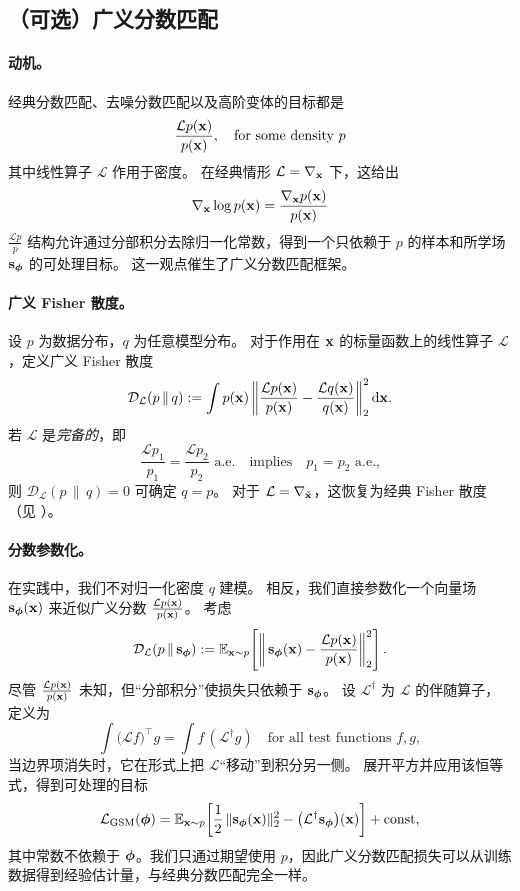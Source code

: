 \subsection{（可选）广义分数匹配}


\paragraph{动机。}
经典分数匹配、去噪分数匹配以及高阶变体的目标都是
\[
\frac{\mathcal L p({\mathbf{x}})}{p({\mathbf{x}})},\quad\text{for some density } p
\]
其中线性算子 $\mathcal L$ 作用于密度。
在经典情形 $\mathcal L=\nabla_{{\mathbf{x}}}$ 下，这给出
\[
\nabla_{{\mathbf{x}}}\log p({\mathbf{x}}) = \frac{\nabla_{{\mathbf{x}}} p({\mathbf{x}})}{p({\mathbf{x}})}
\]
$\frac{\mathcal L p}{p}$ 结构允许通过分部积分去除归一化常数，得到一个只依赖于 $p$ 的样本和所学场 ${\mathbf{s}}_{\bm{\phi}}$ 的可处理目标。
这一观点催生了广义分数匹配框架。

\paragraph{广义 Fisher 散度。}
设 $p$ 为数据分布，$q$ 为任意模型分布。
对于作用在 ${\mathbf{x}}$ 的标量函数上的线性算子 $\mathcal L$，定义广义 Fisher 散度
\[
\mathcal D_{\mathcal L}(p \,\|\, q)
:= \int p({\mathbf{x}}) 
\left\|
\frac{\mathcal L p({\mathbf{x}})}{p({\mathbf{x}})}
-
\frac{\mathcal L q({\mathbf{x}})}{q({\mathbf{x}})}
\right\|_2^2 \mathop{}\!\mathrm{d} {\mathbf{x}}.
\]
若 $\mathcal L$ 是\emph{完备的}，即
\[
\frac{\mathcal L p_1}{p_1}=\frac{\mathcal L p_2}{p_2} \text{ a.e.}\quad \text{implies}\quad p_1=p_2 \text{ a.e.,}
\]
则 $\mathcal D_{\mathcal L}(p \,\|\, q)=0$ 可确定 $q=p$。
对于 $\mathcal L=\nabla_{\tilde{{\mathbf{x}}}}$，这恢复为经典 Fisher 散度（见 ）。

\paragraph{分数参数化。}
在实践中，我们不对归一化密度 $q$ 建模。
相反，我们直接参数化一个向量场 ${\mathbf{s}}_{\bm{\phi}}({\mathbf{x}})$ 来近似广义分数 $\frac{\mathcal L p({\mathbf{x}})}{p({\mathbf{x}})}$。
考虑
\[
\mathcal D_{\mathcal L}\!\left(p \,\|\, {\mathbf{s}}_{\bm{\phi}}\right)
:= \mathbb E_{{\mathbf{x}}\sim p}\!\left[\left\|\,{\mathbf{s}}_{\bm{\phi}}({\mathbf{x}}) - \frac{\mathcal L p({\mathbf{x}})}{p({\mathbf{x}})}\right\|_2^2\right].
\]
尽管 $\frac{\mathcal L p({\mathbf{x}})}{p({\mathbf{x}})}$ 未知，但``分部积分''使损失只依赖于 ${\mathbf{s}}_{\bm{\phi}}$。
设 $\mathcal L^\dagger$ 为 $\mathcal L$ 的伴随算子，定义为
\[
\int \big(\mathcal L f\big)^\top g
= \int f\,(\mathcal L^\dagger g)
\quad\text{for all test functions } f,g,
\]
当边界项消失时，它在形式上把 $\mathcal L$``移动''到积分另一侧。
展开平方并应用该恒等式，得到可处理的目标
\[
\mathcal L_{\text{GSM}}({\bm{\phi}})
= \mathbb E_{{\mathbf{x}}\sim p}\!\left[
\frac{1}{2}\,\|{\mathbf{s}}_{\bm{\phi}}({\mathbf{x}})\|_2^2
-
\big(\mathcal L^\dagger {\mathbf{s}}_{\bm{\phi}}\big)({\mathbf{x}})
\right] + \text{const},
\]
其中常数不依赖于 ${\bm{\phi}}$。我们只通过期望使用 $p$，因此广义分数匹配损失可以从训练数据得到经验估计量，与经典分数匹配完全一样。

